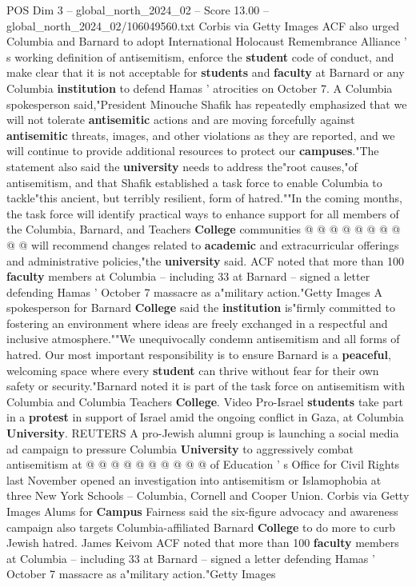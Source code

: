 \begin{textsample}{POS Dim 3 – global\_north\_2024\_02 – Score 13.00 – global\_north\_2024\_02/106049560.txt}
Corbis via Getty Images ACF also urged Columbia and Barnard to adopt International Holocaust Remembrance Alliance ' s working definition of antisemitism, enforce the \textbf{student} code of conduct, and make clear that it is not acceptable for \textbf{students} and \textbf{faculty} at Barnard or any Columbia \textbf{institution} to defend Hamas ' atrocities on October 7.
A Columbia spokesperson said,"President Minouche Shafik has repeatedly emphasized that we will not tolerate \textbf{antisemitic} actions and are moving forcefully against \textbf{antisemitic} threats, images, and other violations as they are reported, and we will continue to provide additional resources to protect our \textbf{campuses}."The statement also said the \textbf{university} needs to address the"root causes,"of antisemitism, and that Shafik established a task force to enable Columbia to tackle"this ancient, but terribly resilient, form of hatred.""In the coming months, the task force will identify practical ways to enhance support for all members of the Columbia, Barnard, and Teachers \textbf{College} communities @ @ @ @ @ @ @ @ @ @ will recommend changes related to \textbf{academic} and extracurricular offerings and administrative policies,"the \textbf{university} said.
ACF noted that more than 100 \textbf{faculty} members at Columbia -- including 33 at Barnard -- signed a letter defending Hamas ' October 7 massacre as a"military action."Getty Images A spokesperson for Barnard \textbf{College} said the \textbf{institution} is"firmly committed to fostering an environment where ideas are freely exchanged in a respectful and inclusive atmosphere.""We unequivocally condemn antisemitism and all forms of hatred.
Our most important responsibility is to ensure Barnard is a \textbf{peaceful}, welcoming space where every \textbf{student} can thrive without fear for their own safety or security."Barnard noted it is part of the task force on antisemitism with Columbia and Columbia Teachers \textbf{College}.
Video Pro-Israel \textbf{students} take part in a \textbf{protest} in support of Israel amid the ongoing conflict in Gaza, at Columbia \textbf{University}.
REUTERS A pro-Jewish alumni group is launching a social media ad campaign to pressure Columbia \textbf{University} to aggressively combat antisemitism at @ @ @ @ @ @ @ @ @ @ of Education ' s Office for Civil Rights last November opened an investigation into antisemitism or Islamophobia at three New York Schools -- Columbia, Cornell and Cooper Union.
Corbis via Getty Images Alums for \textbf{Campus} Fairness said the six-figure advocacy and awareness campaign also targets Columbia-affiliated Barnard \textbf{College} to do more to curb Jewish hatred.
James Keivom ACF noted that more than 100 \textbf{faculty} members at Columbia -- including 33 at Barnard -- signed a letter defending Hamas ' October 7 massacre as a"military action."Getty Images

\end{textsample}

